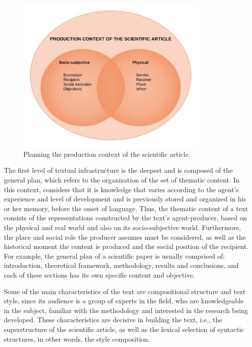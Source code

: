 \documentclass[english]{textolivre}
\begin{document}
\begin{figure}[htbp]
 \centering
 \includegraphics[width=0.85\textwidth]{Fig1.png}
 \caption{Planning the production context of the scientific article.}
 \label{fig-01}
\end{figure}

The first level of textual infrastructure is the deepest and is composed of the general plan, which refers to the organization of the set of thematic content. In this context, \textcite[p. 97/98]{bronckart_atividade_1999} considers that it is knowledge that varies according to the agent’s experience and level of development and is previously stored and organized in his or her memory, before the onset of language. Thus, the thematic content of a text consists of the representations constructed by the text’s agent-producer, based on the physical and real world and also on its socio-subjective world. Furthermore, the place and social role the producer assumes must be considered, as well as the historical moment the content is produced and the social position of the recipient. For example, the general plan of a scientific paper is usually comprised of: introduction, theoretical framework, methodology, results and conclusions, and each of these sections has its own specific content and objective.

Some of the main characteristics of the text are compositional structure and text style, since its audience is a group of experts in the field, who are knowledgeable in the subject, familiar with the methodology and interested in the research being developed. These characteristics are decisive in building the text, i.e., the superstructure of the scientific article, as well as the lexical selection of syntactic structures, in other words, the style composition. 
\end{document}

